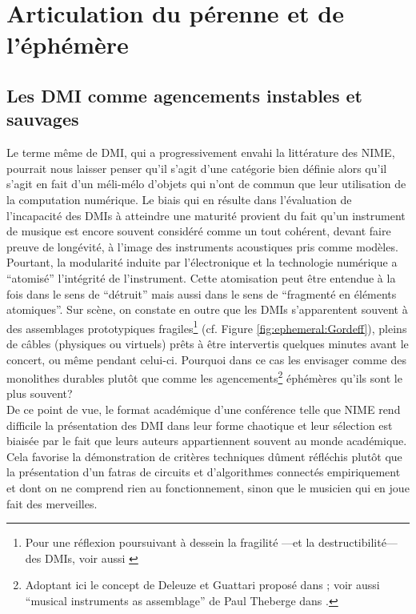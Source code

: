 \section{Articulation du pérenne et de l'éphémère}

\subsection{Les DMI comme agencements instables et sauvages}

\noindent Le terme même de \gls{DMI}, qui a progressivement envahi la littérature des \gls{NIME}, pourrait nous laisser penser qu'il s'agit d'une catégorie bien définie alors qu'il s'agit en fait d'un méli-mélo d'objets qui n'ont de commun que leur utilisation de la computation numérique. Le biais qui en résulte dans l'évaluation de l'incapacité des \glspl{DMI} à atteindre une maturité provient du fait qu'un instrument de musique est encore souvent considéré comme un tout cohérent, devant faire preuve de longévité, à l’image des instruments acoustiques pris comme modèles.\\
\indent Pourtant, la modularité induite par l'électronique et la technologie numérique a ``atomisé'' l'intégrité de l'instrument. Cette atomisation peut être entendue à la fois dans le sens de ``détruit'' mais aussi dans le sens de ``fragmenté en éléments atomiques''. Sur scène, on constate en outre que les \glspl{DMI} s'apparentent souvent à des assemblages prototypiques fragiles\footnote{Pour une réflexion poursuivant à dessein la fragilité —et la destructibilité— des \glspl{DMI}, voir aussi \cite{haddad_fragile_2017}} (cf. Figure \ref{fig:ephemeral:Gordeff}), pleins de câbles (physiques ou virtuels) prêts à être intervertis quelques minutes avant le concert, ou même pendant celui-ci. Pourquoi dans ce cas les envisager comme des monolithes durables plutôt que comme les agencements\footnote{Adoptant ici le concept de Deleuze et Guattari proposé dans \cite{deleuze_mille_1980}; voir aussi ``musical instruments as assemblage'' de Paul Theberge dans \cite{bovermann_musical_2017}.} éphémères qu’ils sont le plus souvent?\\
\indent De ce point de vue, le format académique d'une conférence telle que \gls{NIME} rend difficile la présentation des \gls{DMI} dans leur forme chaotique et leur sélection est biaisée par le fait que leurs auteurs appartiennent souvent au monde académique. Cela favorise la démonstration de critères techniques dûment réfléchis plutôt que la présentation d'un fatras de circuits et d'algorithmes connectés empiriquement et dont on ne comprend rien au fonctionnement, sinon que le musicien qui en joue fait des merveilles.\\
